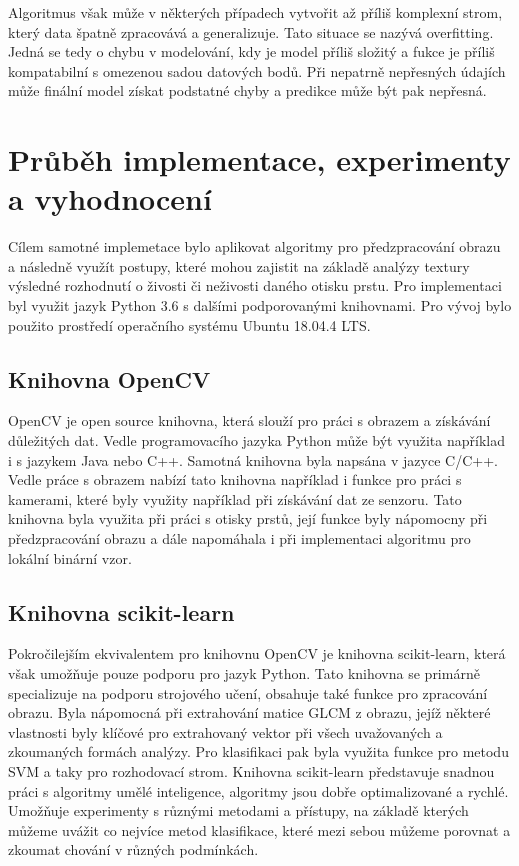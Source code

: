 Algoritmus však může v některých případech vytvořit až příliš komplexní strom, který data špatně zpracovává a generalizuje. Tato situace se nazývá overfitting. Jedná se tedy o chybu v modelování, kdy je model příliš složitý a fukce je příliš kompatabilní s omezenou sadou datových bodů. Při nepatrně nepřesných údajích může finální model získat podstatné chyby a predikce může být pak nepřesná.
    
\chapter{Průběh implementace, experimenty a vyhodnocení}
Cílem samotné implemetace bylo aplikovat algoritmy pro předzpracování obrazu a následně využít postupy, které mohou zajistit na základě analýzy textury výsledné rozhodnutí o živosti či neživosti daného otisku prstu.
Pro implementaci byl využit jazyk Python 3.6 s dalšími podporovanými knihovnami. Pro vývoj bylo použito prostředí operačního systému Ubuntu 18.04.4 LTS.

\section{Knihovna OpenCV}
OpenCV je open source knihovna, která slouží pro práci s obrazem a získávání důležitých dat. Vedle programovacího jazyka Python může být využita například i s jazykem Java nebo C++. Samotná knihovna byla napsána v jazyce C/C++. \cite{OpenCVLibrary} Vedle práce s obrazem nabízí tato knihovna například i funkce pro práci s kamerami, které byly využity například při získávání dat ze senzoru. Tato knihovna byla využita při práci s otisky prstů, její funkce byly nápomocny při předzpracování obrazu a dále napomáhala i při implementaci algoritmu pro lokální binární vzor.

\section{Knihovna scikit-learn}
Pokročilejším ekvivalentem pro knihovnu OpenCV je knihovna scikit-learn, která však umožňuje pouze podporu pro jazyk Python. Tato knihovna se primárně specializuje na podporu strojového učení, obsahuje také funkce pro zpracování obrazu. Byla nápomocná při extrahování matice GLCM z obrazu, jejíž některé vlastnosti byly klíčové pro extrahovaný vektor při všech uvažovaných a zkoumaných formách analýzy. Pro klasifikaci pak byla využita funkce pro metodu SVM a taky pro rozhodovací strom. Knihovna scikit-learn představuje snadnou práci s algoritmy umělé inteligence, algoritmy jsou dobře optimalizované a rychlé. Umožňuje experimenty s různými metodami a přístupy, na základě kterých můžeme uvážit co nejvíce metod klasifikace, které mezi sebou můžeme porovnat a zkoumat chování v různých podmínkách.

